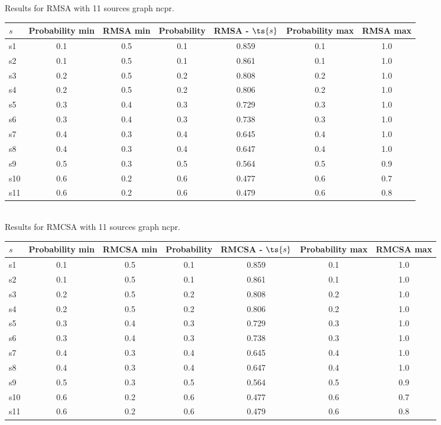\documentclass{article}
\begin{document}
\noindent Results for RMSA with 11 sources graph ncpr.

\noindent\begin{tabular}{|l|c|c|c|c|c|c|}
\hline
$s$& Probability min & RMSA min & Probability & RMSA - $\ts{s}$ & Probability max & RMSA max\\
\hline
s1 &0.1 & 0.5 & 0.1 & 0.859 & 0.1 & 1.0\\
\hline
s2 &0.1 & 0.5 & 0.1 & 0.861 & 0.1 & 1.0\\
\hline
s3 &0.2 & 0.5 & 0.2 & 0.808 & 0.2 & 1.0\\
\hline
s4 &0.2 & 0.5 & 0.2 & 0.806 & 0.2 & 1.0\\
\hline
s5 &0.3 & 0.4 & 0.3 & 0.729 & 0.3 & 1.0\\
\hline
s6 &0.3 & 0.4 & 0.3 & 0.738 & 0.3 & 1.0\\
\hline
s7 &0.4 & 0.3 & 0.4 & 0.645 & 0.4 & 1.0\\
\hline
s8 &0.4 & 0.3 & 0.4 & 0.647 & 0.4 & 1.0\\
\hline
s9 &0.5 & 0.3 & 0.5 & 0.564 & 0.5 & 0.9\\
\hline
s10 &0.6 & 0.2 & 0.6 & 0.477 & 0.6 & 0.7\\
\hline
s11 &0.6 & 0.2 & 0.6 & 0.479 & 0.6 & 0.8\\
\hline
\end{tabular}\\

\noindent Results for RMCSA with 11 sources graph ncpr.

\noindent\begin{tabular}{|l|c|c|c|c|c|c|}
\hline
$s$& Probability min & RMCSA min & Probability & RMCSA - $\ts{s}$ & Probability max & RMCSA max\\
\hline
s1 &0.1 & 0.5 & 0.1 & 0.859 & 0.1 & 1.0\\
\hline
s2 &0.1 & 0.5 & 0.1 & 0.861 & 0.1 & 1.0\\
\hline
s3 &0.2 & 0.5 & 0.2 & 0.808 & 0.2 & 1.0\\
\hline
s4 &0.2 & 0.5 & 0.2 & 0.806 & 0.2 & 1.0\\
\hline
s5 &0.3 & 0.4 & 0.3 & 0.729 & 0.3 & 1.0\\
\hline
s6 &0.3 & 0.4 & 0.3 & 0.738 & 0.3 & 1.0\\
\hline
s7 &0.4 & 0.3 & 0.4 & 0.645 & 0.4 & 1.0\\
\hline
s8 &0.4 & 0.3 & 0.4 & 0.647 & 0.4 & 1.0\\
\hline
s9 &0.5 & 0.3 & 0.5 & 0.564 & 0.5 & 0.9\\
\hline
s10 &0.6 & 0.2 & 0.6 & 0.477 & 0.6 & 0.7\\
\hline
s11 &0.6 & 0.2 & 0.6 & 0.479 & 0.6 & 0.8\\
\hline
\end{tabular}\\
\end{document}
